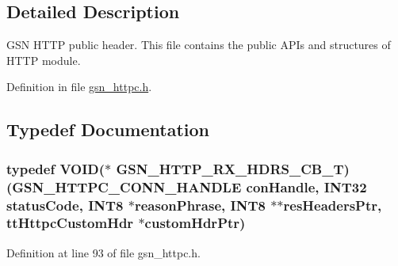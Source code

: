 \subsection{Detailed Description}
GSN HTTP public header. This file contains the public APIs and structures of HTTP module. 

Definition in file \hyperlink{a00507_source}{gsn\_\-httpc.h}.



\subsection{Typedef Documentation}
\hypertarget{a00507_ac8f1951ac3188114d05c988f1c689b0f}{
\subsubsection[{GSN\_\-HTTP\_\-RX\_\-HDRS\_\-CB\_\-T}]{\setlength{\rightskip}{0pt plus 5cm}typedef VOID($\ast$  {\bf GSN\_\-HTTP\_\-RX\_\-HDRS\_\-CB\_\-T})({\bf GSN\_\-HTTPC\_\-CONN\_\-HANDLE} conHandle, {\bf INT32} statusCode, {\bf INT8} $\ast$reasonPhrase, {\bf INT8} $\ast$$\ast$resHeadersPtr, ttHttpcCustomHdr $\ast$customHdrPtr)}}
\label{a00507_ac8f1951ac3188114d05c988f1c689b0f}


Definition at line 93 of file gsn\_\-httpc.h.

